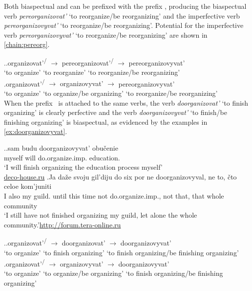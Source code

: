 Both biaspectual and  can be prefixed with the  prefix , producing the biaspectual verb \textit{pereorganizovat'} `to reorganize/be reorganizing' and the imperfective verb \textit{pereorganizovyvat'} `to reorganize/be reorganizing'. Potential  for the imperfective verb \textit{pereorganizovyvat'} `to reorganize/be reorganizing' are shown in \ref{chain:pereorg}. 

\ex.\label{chain:pereorg}\ag.organizovat'\textsuperscript{\PF\slash\IPF} {$\rightarrow$} {pereorganizovat'\textsuperscript{\PF\slash\IPF}} {$\rightarrow$} pereorganizovyvat'\textsuperscript{\IPF}\\
{`to organize'} {} {`to reorganize'} {} {`to reorganize/be reorganizing'}\\
\bg.organizovat'\textsuperscript{\PF\slash\IPF} {$\rightarrow$} {organizovyvat'\textsuperscript{\IPF}} {$\rightarrow$} pereorganizovyvat'\textsuperscript{\IPF}\\
{`to organize'} {} {`to organize/be organizing'} {} {`to reorganize/be reorganizing'}\\

When the  prefix\largerpage\  is attached to the same verbs, the verb \textit{doorganizovat'} `to finish organizing' is clearly perfective and the verb \textit{doorganizovyvat'} `to finish/be finishing organizing' is biaspectual, as evidenced by the examples in \ref{ex:doorganizovyvat}.

\ex.\label{ex:doorganizovyvat}\ag.sam budu doorganizovyvat'\textsuperscript{\IPF} obu\v{c}enie\\
myself will do.organize.imp. education.\\
\trans `I will finish organizing the education process myself'\\\hbox{}\hfill\hbox{\url{deco-house.ru}}
\bg.Ja da\v{z}e svoju gil'diju do six por ne doorganizovyval\textsuperscript{\PF}, ne to, \v{c}to celoe kom'juniti\\
I also my guild. until this time not do.organize.imp., not that, that whole community\\
\trans `I still have not finished organizing my guild, let alone the whole community.'\hbox{}\hfill\hbox{\url{http://forum.tera-online.ru}}

\ex.\label{chain:doorg}\ag.organizovat'\textsuperscript{\PF\slash\IPF} {$\rightarrow$} {doorganizovat'\textsuperscript{\PF}} {$\rightarrow$} doorganizovyvat'\textsuperscript{\IPF}\\
{`to organize'} {} {`to finish organizing'} {} {`to finish organizing/be finishing organizing'}\\
\bg.organizovat'\textsuperscript{\PF\slash\IPF} {$\rightarrow$} {organizovyvat'\textsuperscript{\IPF}} {$\rightarrow$} doorganizovyvat'\textsuperscript{\PF}\\
{`to organize'} {} {`to organize/be organizing'} {} {`to finish organizing/be finishing organizing'}\\

